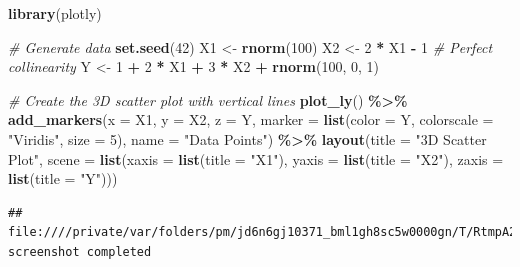 \documentclass[
]{book}
\newenvironment{Shaded}{\begin{snugshade}}{\end{snugshade}}
\newcommand{\AttributeTok}[1]{\textcolor[rgb]{0.13,0.29,0.53}{#1}}
\newcommand{\CommentTok}[1]{\textcolor[rgb]{0.56,0.35,0.01}{\textit{#1}}}
\newcommand{\DecValTok}[1]{\textcolor[rgb]{0.00,0.00,0.81}{#1}}
\newcommand{\FunctionTok}[1]{\textcolor[rgb]{0.13,0.29,0.53}{\textbf{#1}}}
\newcommand{\NormalTok}[1]{#1}
\newcommand{\OtherTok}[1]{\textcolor[rgb]{0.56,0.35,0.01}{#1}}
\newcommand{\SpecialCharTok}[1]{\textcolor[rgb]{0.81,0.36,0.00}{\textbf{#1}}}
\newcommand{\StringTok}[1]{\textcolor[rgb]{0.31,0.60,0.02}{#1}}
\begin{document}
\begin{Shaded}
\begin{Highlighting}[]
\FunctionTok{library}\NormalTok{(plotly)}

\CommentTok{\# Generate data}
\FunctionTok{set.seed}\NormalTok{(}\DecValTok{42}\NormalTok{)}
\NormalTok{X1 }\OtherTok{\textless{}{-}} \FunctionTok{rnorm}\NormalTok{(}\DecValTok{100}\NormalTok{)}
\NormalTok{X2 }\OtherTok{\textless{}{-}} \DecValTok{2} \SpecialCharTok{*}\NormalTok{ X1 }\SpecialCharTok{{-}} \DecValTok{1}  \CommentTok{\# Perfect collinearity}
\NormalTok{Y  }\OtherTok{\textless{}{-}} \DecValTok{1} \SpecialCharTok{+} \DecValTok{2} \SpecialCharTok{*}\NormalTok{ X1 }\SpecialCharTok{+} \DecValTok{3} \SpecialCharTok{*}\NormalTok{ X2 }\SpecialCharTok{+} \FunctionTok{rnorm}\NormalTok{(}\DecValTok{100}\NormalTok{, }\DecValTok{0}\NormalTok{, }\DecValTok{1}\NormalTok{)}

\CommentTok{\# Create the 3D scatter plot with vertical lines}
\FunctionTok{plot\_ly}\NormalTok{() }\SpecialCharTok{\%\textgreater{}\%}
  \FunctionTok{add\_markers}\NormalTok{(}\AttributeTok{x =}\NormalTok{ X1, }\AttributeTok{y =}\NormalTok{ X2, }\AttributeTok{z =}\NormalTok{ Y, }
              \AttributeTok{marker =} \FunctionTok{list}\NormalTok{(}\AttributeTok{color =}\NormalTok{ Y, }\AttributeTok{colorscale =} \StringTok{"Viridis"}\NormalTok{, }\AttributeTok{size =} \DecValTok{5}\NormalTok{),}
              \AttributeTok{name =} \StringTok{"Data Points"}\NormalTok{) }\SpecialCharTok{\%\textgreater{}\%}
  \FunctionTok{layout}\NormalTok{(}\AttributeTok{title =} \StringTok{"3D Scatter Plot"}\NormalTok{,}
         \AttributeTok{scene =} \FunctionTok{list}\NormalTok{(}\AttributeTok{xaxis =} \FunctionTok{list}\NormalTok{(}\AttributeTok{title =} \StringTok{"X1"}\NormalTok{),}
                      \AttributeTok{yaxis =} \FunctionTok{list}\NormalTok{(}\AttributeTok{title =} \StringTok{"X2"}\NormalTok{),}
                      \AttributeTok{zaxis =} \FunctionTok{list}\NormalTok{(}\AttributeTok{title =} \StringTok{"Y"}\NormalTok{)))}
\end{Highlighting}
\end{Shaded}

\begin{verbatim}
## file:////private/var/folders/pm/jd6n6gj10371_bml1gh8sc5w0000gn/T/RtmpA2mSas/filed48f4253de26/widgetd48f101db2cf.html screenshot completed
\end{verbatim}
\end{document}
